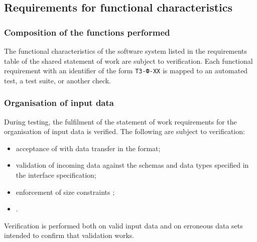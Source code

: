 \documentclass[12pt,a4paper]{extarticle}
\begin{document}
\subsection{Requirements for functional characteristics}

\subsubsection{Composition of the functions performed}


The functional characteristics of the software system listed in the requirements table of the shared statement of work are subject to verification. Each functional requirement with an identifier of the form \texttt{ТЗ-Ф-XX} is mapped to an automated test, a test suite, or another check.



\clearpage

\subsubsection{Organisation of input data}

\begin{hseExample}
During testing, the fulfilment of the statement of work requirements for the organisation of input data is verified. The following are subject to verification:

\begin{itemize}[leftmargin=1.25cm]
    \item acceptance of  with data transfer in the  format;
    \item validation of incoming data against the schemas and data types specified in the interface specification;
    \item enforcement of size constraints ;
    \item {}.
\end{itemize}

Verification is performed both on valid input data and on erroneous data sets intended to confirm that validation works.
\end{hseExample}
\end{document}
